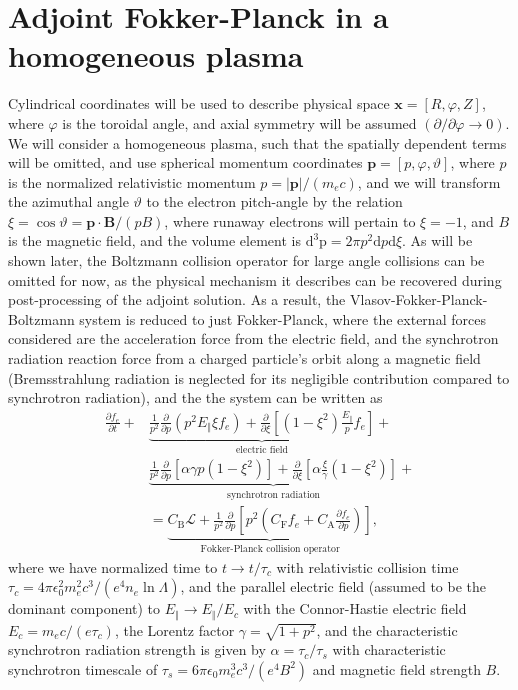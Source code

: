 \documentclass[preprint,aip]{revtex4-2}
\begin{document}
\section{Adjoint Fokker-Planck in a homogeneous plasma}
Cylindrical coordinates will be used to describe physical space $\mathbf{x} = [R,\varphi,Z]$, where $\varphi$ is the toroidal angle, and axial symmetry will be assumed $(\partial/\partial\varphi \to 0)$. We will consider a homogeneous plasma, such that the spatially dependent terms will be omitted, and use spherical momentum coordinates $\mathbf{p} = [p,\varphi,\vartheta]$, where $p$ is the normalized relativistic momentum $p = |\mathbf{p}|/(m_ec)$, and we will transform the azimuthal angle $\vartheta$ to the electron pitch-angle by the relation $\xi = \cos\vartheta = \mathbf{p\cdot B}/(pB)$, where runaway electrons will pertain to $\xi = -1$, and $B$ is the magnetic field, and the volume element is $\mathrm{d^3p} = 2\pi p^2\mathrm{d}p\mathrm{d}\xi$. As will be shown later, the Boltzmann collision operator for large angle collisions can be omitted for now, as the physical mechanism it describes can be recovered during post-processing of the adjoint solution. As a result, the Vlasov-Fokker-Planck-Boltzmann system is reduced to just Fokker-Planck, where the external forces considered are the acceleration force from the electric field, and the synchrotron radiation reaction force from a charged particle's orbit along a magnetic field (Bremsstrahlung radiation is neglected for its negligible contribution compared to synchrotron radiation), and the the system can be written as 
\begin{equation}\label{eq:AFP1}
\begin{aligned}
\frac{\partial f_e}{\partial t} + 
&\underbrace{
			\frac{1}{p^2}\frac{\partial}{\partial p}\left( p^2 E_\Vert\xi f_e\right) + 
			\frac{\partial}{\partial\xi}\left[\left(1-\xi^2\right)\frac{E_\Vert}{p}f_e\right]
			}_\textrm{electric field} + \\
&\underbrace{
			\frac{1}{p^2}\frac{\partial}{\partial p}\left[\alpha\gamma p\left(1-\xi^2\right)\right] +
			\frac{\partial}{\partial\xi}\left[\alpha\frac{\xi}{\gamma}\left(1-\xi^2\right)\right]
			}_\textrm{synchrotron radiation} + \\
&= \underbrace{
		C_\mathrm{B}\mathscr{L} + 
		\frac{1}{p^2}\frac{\partial}{\partial p}\left[p^2\left(C_\mathrm{F}f_e + C_\mathrm{A}\frac{\partial f_e}{\partial p}\right)\right]
		}_\textrm{Fokker-Planck collision operator},
\end{aligned}
\end{equation}
where we have normalized time to $t \to t/\tau_c$ with relativistic collision time $\tau_c = 4\pi\epsilon_0^2m_e^2c^3/(e^4n_e\ln\Lambda)$, and the parallel electric field (assumed to be the dominant component) to $E_\Vert \to E_\Vert/E_c$ with the Connor-Hastie electric field $E_c = m_ec/(e\tau_c)$, the Lorentz factor $\gamma = \sqrt{1+p^2}$, and the characteristic synchrotron radiation strength is given by $\alpha = \tau_c/\tau_s$ with characteristic synchrotron timescale of $\tau_s = 6\pi\epsilon_0m_e^3c^3/(e^4B^2)$ and magnetic field strength $B$. 
\end{document}
